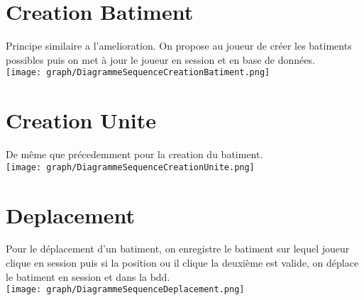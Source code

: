     \section{Creation Batiment}
    Principe similaire a l'amelioration. On propose au joueur de créer les batiments possibles puis on met à jour le joueur en session et en base de données. \\
        \texttt{[image: graph/DiagrammeSequenceCreationBatiment.png]}  
        
   \section{Creation Unite}
   De même que précedemment pour la creation du batiment. \\

        \texttt{[image: graph/DiagrammeSequenceCreationUnite.png]}    
        
   \section{Deplacement}

    Pour le déplacement d'un batiment, on enregistre le batiment sur lequel joueur clique en session puis si la position ou il clique la deuxième est valide, on déplace le batiment en session et dans la bdd. \\ 
    
        \texttt{[image: graph/DiagrammeSequenceDeplacement.png]}    
        
 
